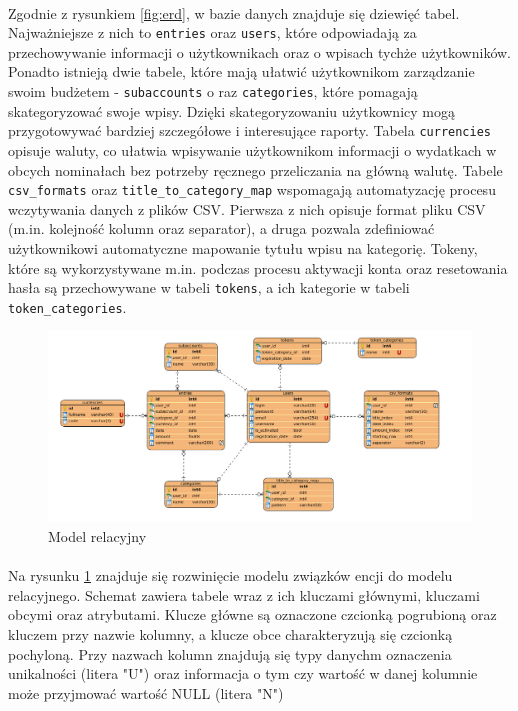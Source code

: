 \documentclass{article}
\begin{document}
	\paragraph{} Zgodnie z rysunkiem \ref{fig:erd}, w bazie danych znajduje się dziewięć tabel. Najważniejsze z nich to \texttt{entries} oraz \texttt{users}, które odpowiadają za przechowywanie informacji o użytkownikach oraz o wpisach tychże użytkowników. Ponadto istnieją dwie tabele, które mają ułatwić użytkownikom zarządzanie swoim budżetem - \texttt{subaccounts} o raz \texttt{categories}, które pomagają skategoryzować swoje wpisy. Dzięki skategoryzowaniu użytkownicy mogą przygotowywać bardziej szczegółowe i interesujące raporty. Tabela \texttt{currencies} opisuje waluty, co ułatwia wpisywanie użytkownikom informacji o wydatkach w obcych nominałach bez potrzeby ręcznego przeliczania na główną walutę. Tabele \texttt{csv\_formats} oraz \texttt{title\_to\_category\_map} wspomagają automatyzację procesu wczytywania danych z plików CSV. Pierwsza z nich opisuje format pliku CSV (m.in. kolejność kolumn oraz separator), a druga pozwala zdefiniować użytkownikowi automatyczne mapowanie tytułu wpisu na kategorię. Tokeny, które są wykorzystywane m.in. podczas procesu aktywacji konta oraz resetowania hasła są przechowywane w tabeli \texttt{tokens}, a ich kategorie w tabeli \texttt{token\_categories}.

	\begin{figure}[H]
		\centering
		\includegraphics[width=1\linewidth]{assets/rel.png}
		\caption[]{Model relacyjny}
		\label{fig:rel}
	\end{figure}

	\paragraph{} Na rysunku \ref{fig:rel} znajduje się rozwinięcie modelu związków encji do modelu relacyjnego. Schemat zawiera tabele wraz z ich kluczami głównymi, kluczami obcymi oraz atrybutami. Klucze główne są oznaczone czcionką pogrubioną oraz kluczem przy nazwie kolumny, a klucze obce charakteryzują się czcionką pochyloną. Przy nazwach kolumn znajdują się typy danychm oznaczenia unikalności (litera "U") oraz informacja o tym czy wartość w danej kolumnie może przyjmować wartość NULL (litera "N")
\end{document}
